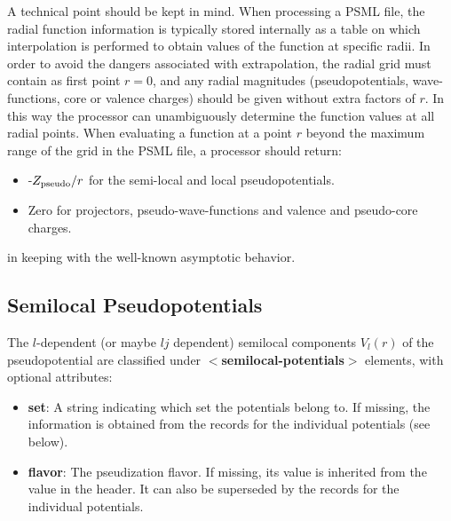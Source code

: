 \documentclass[prb,showpacs,superscriptaddress]{revtex4-1}
\def\tag#1{\textbf{$<$#1$>$}}
\def\att#1{\textbf{#1}}
\begin{document}
A technical point should be kept in mind. When processing a PSML file,
the radial function information is typically stored internally as a
table on which interpolation is performed to obtain values of the
function at specific radii. In order to avoid the dangers associated
with extrapolation, the radial grid must contain as first point $r=0$,
and any radial magnitudes (pseudopotentials, wave-functions, core or
valence charges) should be given without extra factors of $r$. In this
way the processor can unambiguously determine the function values at
all radial points. When evaluating a function at a point $r$ beyond
the maximum range of the grid in the PSML file, a processor should
return:
%
\begin{itemize}
\item -$Z_{\rm pseudo}/r$ for the semi-local and local pseudopotentials.
\item Zero for projectors, pseudo-wave-functions and valence and pseudo-core
  charges.
\end{itemize}
%
in keeping with the well-known asymptotic behavior.


\subsection{Semilocal Pseudopotentials}

The $l$-dependent (or maybe $lj$ dependent) semilocal components
$V_l(r)$ of the pseudopotential are classified under
\tag{semilocal-potentials} elements, with optional attributes:
              
 \begin{itemize}
    \item \att{set}: A string indicating which set the potentials
      belong to. If missing, the information is obtained from the
records for the individual potentials (see below).

    \item \att{flavor}: The pseudization flavor. If missing, its
      value is inherited from the value in the header. It can also
      be superseded by the records for the individual potentials.
 \end{itemize}
\end{document}
